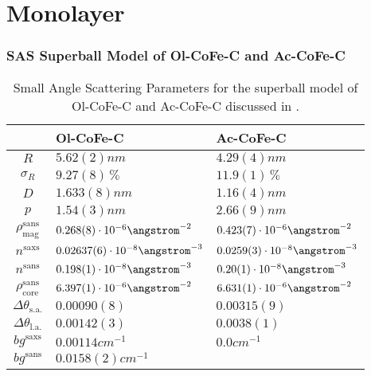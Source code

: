 \documentclass[\main/dresen_thesis.tex]{subfiles}
\begin{document}
\section{Monolayer}
  \subsubsection{SAS Superball Model of Ol-CoFe-C and Ac-CoFe-C}\label{ch:appendix:modelparameters:monolayers:sas_olac_cofe_c}
    \begin{table}[ht]
      \centering
      \caption{\label{tab:appendix:modelparamters:monolayers:nanoparticle:sas}Small Angle Scattering Parameters for the superball model of Ol-CoFe-C and Ac-CoFe-C discussed in .}
      \begin{tabular}{ c | l | l }
          & Ol-CoFe-C & Ac-CoFe-C \\
        \hline
        $R$
          & $5.62(2) \unit{nm}$
          & $4.29(4) \unit{nm}$\\
        $\sigma_R$
          & $9.27(8) \,\%$
          & $11.9(1) \,\%$\\
        $D$
          & $1.633(8) \unit{nm}$
          & $1.16(4) \unit{nm}$\\
        $p$
          & $1.54(3) \unit{nm}$
          & $2.66(9) \unit{nm}$\\
        $\rho_\mathrm{mag}^\mathrm{sans}$
          & $0.268(8) \cdot 10^{-6} \angstrom^{-2}$
          & $0.423(7) \cdot 10^{-6} \angstrom^{-2}$\\
        \hline
        $n^\mathrm{saxs}$
          & $0.02637(6) \cdot 10^{-8} \angstrom^{-3}$
          & $0.0259(3) \cdot 10^{-8} \angstrom^{-3}$\\
        $n^\mathrm{sans}$
          & $0.198(1) \cdot 10^{-8} \angstrom^{-3}$
          & $0.20(1) \cdot 10^{-8} \angstrom^{-3}$\\
        $\rho_\mathrm{core}^\mathrm{sans}$
          & $6.397(1) \cdot 10^{-6} \angstrom^{-2}$
          & $6.631(1) \cdot 10^{-6} \angstrom^{-2}$\\
        $\Delta \theta_\mathrm{s. a.}$
          & $0.00090(8)$
          & $0.00315(9)$\\
        $\Delta \theta_\mathrm{l. a.}$
          & $0.00142(3)$
          & $0.0038(1)$\\
        $bg^\mathrm{saxs}$
          & $0.00114 \unit{cm}^{-1}$
          & $0.0 \unit{cm}^{-1}$\\
        $bg^\mathrm{sans}$
          & $0.0158(2) \unit{cm}^{-1}$

\end{tabular}
\end{table}
\end{document}
